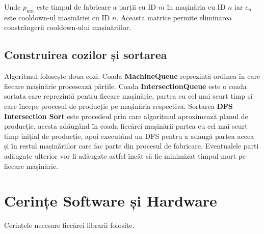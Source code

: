 \documentclass[12pt, twoside]{article}
\begin{document}
Unde $p_{mn}$ este timpul de fabricare a parții cu ID $m$
în mașinăria cu ID $n$ iar $c_n$ este cooldown-ul mașinăriei
cu ID $n$. Aceasta matrice permite eliminarea constrângerii
cooldown-ului mașinăriilor.

\subsection{Construirea cozilor și sortarea}

Algoritmul folosește doua cozi. Coada \textbf{MachineQueue}
reprezintă ordinea în care fiecare mașinărie procesează părțile.
Coada \textbf{IntersectionQueue} este o coada sortata care
reprezintă pentru fiecare mașinărie, partea cu cel mai scurt
timp și care începe procesul de producție pe mașinăria respectiva.
\newline
\newline
Sortarea \textbf{DFS Intersection Sort} este procedeul prin care
algoritmul aproximează planul de producție, acesta adăugând în coada
fiecărei mașinării partea cu cel mai scurt timp inițial de producție,
apoi executând un DFS pentru a adaugă partea aceea și în restul mașinăriilor
care fac parte din procesul de fabricare. Eventualele parti adăugate ulterior vor fi
adăugate astfel încât să fie minimizat timpul mort pe fiecare mașinărie.

\section{Cerințe Software și Hardware}
Cerințele necesare fiecărei librarii folosite.
\end{document}
